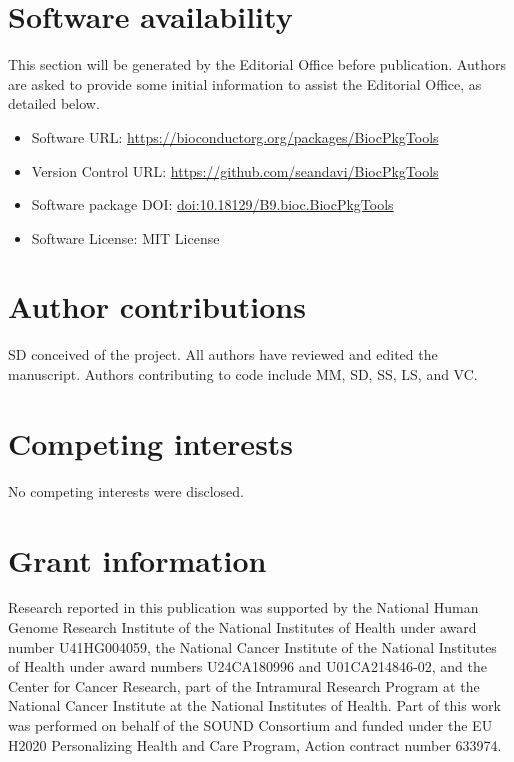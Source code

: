 \documentclass[9pt,a4paper]{extarticle}\usepackage[]{graphicx}\usepackage[]{color}
\begin{document}
\section*{Software availability}
This section will be generated by the Editorial Office before publication. Authors are asked to provide some initial information to assist the Editorial Office, as detailed below.
\begin{itemize}
\item Software URL: \href{https://bioconductor.org/packages/BiocPkgTools}{https://bioconductorg.org/packages/BiocPkgTools} 
\item Version Control URL: \href{https://github.com/seandavi/BiocPkgTools}{https://github.com/seandavi/BiocPkgTools} 
\item Software package DOI: \href{https://doi.org/doi:10.18129/B9.bioc.BiocPkgTools}{doi:10.18129/B9.bioc.BiocPkgTools}
\item Software License: MIT License
\end{itemize}



\section*{Author contributions}
SD conceived of the project. All authors have reviewed and edited the manuscript. Authors contributing to code include MM, SD, SS, LS, and VC. 


\section*{Competing interests}
No competing interests were disclosed.

\section*{Grant information}

Research reported in this publication was supported by the National
Human Genome Research Institute of the National Institutes of Health
under award number U41HG004059, the National Cancer Institute of the
National Institutes of Health under award numbers U24CA180996 and
U01CA214846-02, and the Center for Cancer Research, part of the
Intramural Research Program at the National Cancer Institute at the
National Institutes of Health. Part of this work was performed on
behalf of the SOUND Consortium and funded under the EU H2020
Personalizing Health and Care Program, Action contract number 633974.



%
%
%
%
%
%
%

\end{document}
